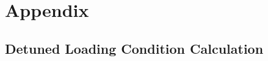 
{\chapter{Appendix}\label{chap:appendix}}   %

\setcounter{figure}{0}

\section{Detuned Loading Condition Calculation}\label{sec:detuned_loading_cal}

